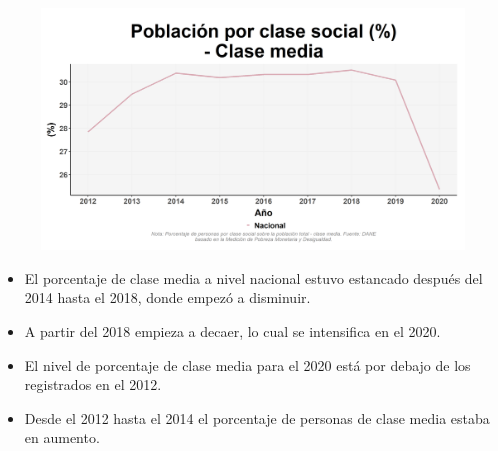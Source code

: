     \begin{figure}[H]
        \caption[Población por clase social - Clase media a nivel nacional ]{\label{clase_media_nacional} }
        \begin{center}
        \includegraphics[width=\textwidth,keepaspectratio]{img/var_248_trend.png}
        \end{center}
    \end{figure}
            \begin{itemize}
                    \item El porcentaje de clase media a nivel nacional estuvo estancado después del 2014 hasta el 2018, donde empezó a disminuir.
                    \item A partir del 2018 empieza a decaer, lo cual se intensifica en el 2020.
                    \item El nivel de porcentaje de clase media para el 2020 está por debajo de los registrados en el 2012.
                    \item Desde el 2012 hasta el 2014 el porcentaje de personas de clase media estaba en aumento.
                    \end{itemize}

